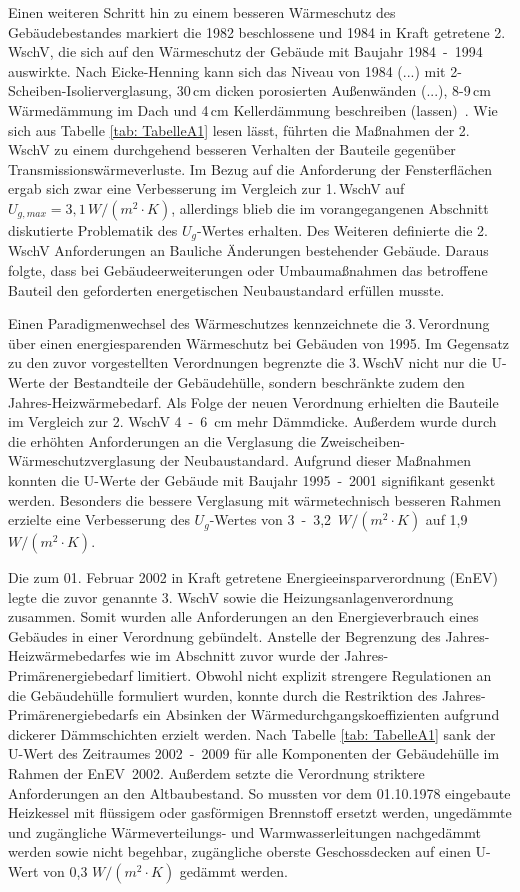 Einen weiteren Schritt hin zu einem besseren Wärmeschutz des Gebäudebestandes markiert die 1982 beschlossene und 1984 in Kraft getretene 2. WschV, die sich auf den Wärmeschutz der Gebäude mit Baujahr \mbox{1984 - 1994} auswirkte.
Nach Eicke-Henning kann sich \glqq das Niveau von 1984 (...) mit 2-Scheiben-Isolierverglasung, 30\,cm dicken porosierten Außenwänden (...), 8-9\,cm Wärmedämmung im Dach und 4\,cm Kellerdämmung beschreiben (lassen) \grqq\,\cite{EickeHenning.2011}.
Wie sich aus Tabelle \ref{tab: TabelleA1} lesen lässt, führten die Maßnahmen der 2.\,WschV zu einem durchgehend besseren Verhalten der Bauteile gegenüber Transmissionswärmeverluste. 
Im Bezug auf die Anforderung der Fensterflächen ergab sich zwar eine Verbesserung im Vergleich zur 1.\,WschV auf \(U_{g, max} = 3,1\,W/(m^2 \cdot K) \), allerdings blieb die im vorangegangenen Abschnitt diskutierte Problematik des \(U_g\)-Wertes erhalten.
Des Weiteren definierte die 2. WschV Anforderungen an \glqq Bauliche Änderungen bestehender Gebäude\grqq.
Daraus folgte, dass bei Gebäudeerweiterungen oder Umbaumaßnahmen das betroffene Bauteil den geforderten energetischen Neubaustandard erfüllen musste.

Einen Paradigmenwechsel des Wärmeschutzes kennzeichnete die 3.\,Verordnung über einen energiesparenden Wärmeschutz bei Gebäuden von 1995.
Im Gegensatz zu den zuvor vorgestellten Verordnungen begrenzte die 3.\,WschV nicht nur die U-Werte der Bestandteile der Gebäudehülle, sondern beschränkte zudem den Jahres-Heizwärmebedarf.
Als Folge der neuen Verordnung erhielten die Bauteile im Vergleich zur 2. WschV \mbox{4 - 6 cm} mehr Dämmdicke. 
Außerdem wurde durch die erhöhten Anforderungen an die Verglasung die Zweischeiben-Wärmeschutzverglasung der Neubaustandard.
Aufgrund dieser Maßnahmen konnten die U-Werte der Gebäude mit Baujahr \mbox{1995 - 2001} signifikant gesenkt werden.
Besonders die bessere Verglasung mit wärmetechnisch besseren Rahmen erzielte eine Verbesserung des \(U_g\)-Wertes von \mbox{3 - 3,2 \(W/(m^2 \cdot K) \)} auf 1,9\,\(W/(m^2 \cdot K) \).

Die zum 01. Februar 2002 in Kraft getretene Energieeinsparverordnung (EnEV) legte die zuvor genannte 3. WschV sowie die Heizungsanlagenverordnung zusammen. 
Somit wurden alle Anforderungen an den Energieverbrauch eines Gebäudes in einer Verordnung gebündelt.
Anstelle der Begrenzung des Jahres-Heizwärmebedarfes wie im Abschnitt zuvor wurde der Jahres-Primärenergiebedarf limitiert.
Obwohl nicht explizit strengere Regulationen an die Gebäudehülle formuliert wurden, konnte durch die Restriktion des Jahres-Primärenergiebedarfs ein Absinken der Wärmedurchgangskoeffizienten aufgrund dickerer Dämmschichten erzielt werden.
Nach Tabelle \ref{tab: TabelleA1} sank der U-Wert des Zeitraumes \mbox{2002 - 2009} für alle Komponenten der Gebäudehülle im Rahmen der \mbox{EnEV 2002}.
Außerdem setzte die Verordnung striktere Anforderungen an den Altbaubestand. 
So mussten vor dem 01.10.1978 eingebaute Heizkessel mit flüssigem oder gasförmigen Brennstoff ersetzt werden, ungedämmte und zugängliche Wärmeverteilungs- und Warmwasserleitungen nachgedämmt werden sowie nicht begehbar, zugängliche oberste Geschossdecken auf einen U-Wert von 0,3 \(W/(m^2 \cdot K) \) gedämmt werden.

